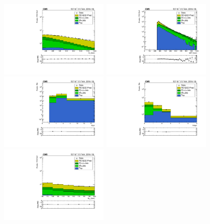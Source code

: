 \begin{figure}[!htbp]
  \begin{center}
    \includegraphics[width=0.46\textwidth]{figs/qcd/rs_data/c_crRSDPhiMT2InclusiveHT450to1200_h_ht.pdf}
    \includegraphics[width=0.46\textwidth]{figs/qcd/rs_data/c_crRSDPhiMT2InclusiveHT450to1200_h_met.pdf}
    \includegraphics[width=0.46\textwidth]{figs/qcd/rs_data/c_crRSDPhiMT2InclusiveHT450to1200_h_nJet30.pdf}
    \includegraphics[width=0.46\textwidth]{figs/qcd/rs_data/c_crRSDPhiMT2InclusiveHT450to1200_h_nBJet20.pdf}
    \includegraphics[width=0.46\textwidth]{figs/qcd/rs_data/c_crRSDPhiMT2InclusiveHT450to1200_h_mt2.pdf}

\end{center}
\end{figure}
